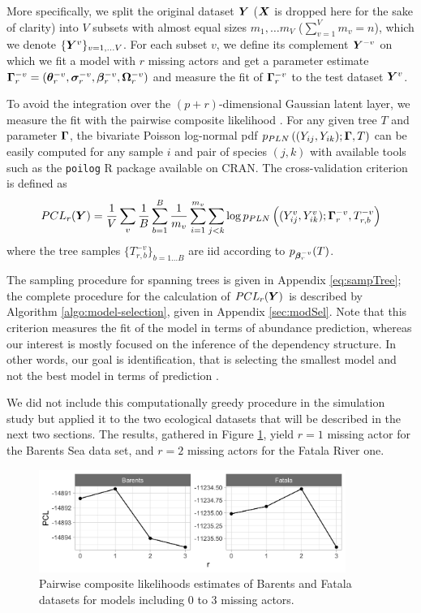 More specifically, we split the original dataset ${\boldsymbol{Y}}$ (${\boldsymbol{X}}$ is dropped here for the sake of clarity) into $V$ subsets with almost equal sizes $m_1, \dots m_V$ ($\sum_{v=1}^V m_v = n$), which we denote $\{{\boldsymbol{Y}}^v\}_{v = 1, \dots V}$. For each subset $v$, we define its complement ${\boldsymbol{Y}}^{-v}$ on which we fit a model with $r$ missing actors and get a parameter estimate ${\boldsymbol{\Gamma}}_r^{-v} = ({\boldsymbol{\theta}}_r^{-v}, {\boldsymbol{\sigma}}_r^{-v}, {\boldsymbol{\beta}}^{-v}_r, {\boldsymbol{\Omega}}_r^{-v})$ and measure the fit of ${\boldsymbol{\Gamma}}_r^{-v}$ to the test dataset ${\boldsymbol{Y}}^v$. 

To avoid the integration over the $(p+r)$-dimensional Gaussian latent layer, we measure the fit with the pairwise composite likelihood \citep{lindsay}.
For any given tree $T$ and parameter ${\boldsymbol{\Gamma}}$, the bivariate Poisson log-normal pdf $p_{PLN}\left((Y_{ij}, Y_{ik}); {\boldsymbol{\Gamma}}, T \right)$ can be easily computed for any sample $i$ and pair of species $(j, k)$ with available tools such as the \texttt{poilog} R package \citep{ViS08} available on CRAN. The cross-validation criterion is defined as
$$
PCL_r({\boldsymbol{Y}}) = \frac1V \sum_v \frac1B \sum_{b=1}^B \frac1{m_v} \sum_{i = 1}^{m_v} \sum_{j < k} \log p_{PLN}\left((Y^v_{ij}, Y^v_{ik}); {\boldsymbol{\Gamma}}_r^{-v}, T_{r, b}^{-v} \right)
$$
where the tree samples $\{T_{r, b}^{-v}\}_{b=1 \dots B}$ are iid according to $p_{{\boldsymbol{\beta}}_r^{-v}}(T)$. 

The sampling procedure for spanning trees is given in Appendix \ref{eq:sampTree}; the complete procedure for the calculation of $PCL_r({\boldsymbol{Y}})$ is described by Algorithm \ref{algo:model-selection}, given in Appendix \ref{sec:modSel}. Note that this criterion measures the fit of the model in terms of abundance prediction, whereas our interest is mostly focused on the inference of the dependency structure. In other words, our goal is identification, that is selecting the smallest model  and not the best model in terms of prediction \citep{arlot2010survey}.


We did not include this computationally greedy procedure in the simulation study but applied it to the two ecological datasets that will be described in the next two sections. The results, gathered in Figure \ref{fig:selec}, yield $r=1$ missing actor for the Barents Sea data set, and $r=2$ missing actors for the Fatala River one.

\begin{figure}[H]
    \centering
    \includegraphics[width=10cm]{figs/selec_model_applis.png}
    \caption{Pairwise composite likelihoods estimates of Barents and Fatala datasets for models including 0 to 3 missing actors.}
    \label{fig:selec}
\end{figure}


